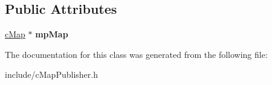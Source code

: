 \subsection*{Public Attributes}
\begin{DoxyCompactItemize}
\item 
\hyperlink{classMultiColSLAM_1_1cMap}{c\+Map} $\ast$ {\bfseries mp\+Map}\hypertarget{classMultiColSLAM_1_1cMapPublisher_acb5127b43391b1be4b703eb18c980f66}{}\label{classMultiColSLAM_1_1cMapPublisher_acb5127b43391b1be4b703eb18c980f66}

\end{DoxyCompactItemize}


The documentation for this class was generated from the following file\+:\begin{DoxyCompactItemize}
\item 
include/c\+Map\+Publisher.\+h\end{DoxyCompactItemize}
